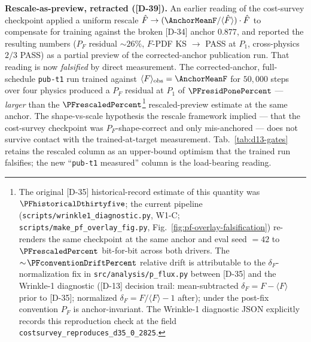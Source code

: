 \textbf{Rescale-as-preview, retracted ([D-39]).} An earlier reading of the cost-survey checkpoint applied a uniform rescale $\hat{F} \to (\AnchorMeanF/\langle\hat{F}\rangle)\cdot\hat{F}$ to compensate for training against the broken [D-34] anchor $0.877$, and reported the resulting numbers ($P_F$ residual $\sim 26\%$, $F$-PDF KS $\to$ PASS at $P_1$, cross-physics $2/3$ PASS) as a partial preview of the corrected-anchor publication run. That reading is now \emph{falsified} by direct measurement. The corrected-anchor, full-schedule \texttt{pub-t1} run trained against $\langle F\rangle_{\text{obs}}=\AnchorMeanF$ for $50{,}000$ steps over four physics produced a $P_F$ residual at $P_1$ of $\PFresidPonePercent$ --- \emph{larger} than the $\PFrescaledPercent$\footnote{The original [D-35] historical-record estimate of this quantity was $\PFhistoricalDthirtyfive$; the current pipeline (\texttt{scripts/wrinkle1\_diagnostic.py}, W1-C; \texttt{scripts/make\_pf\_overlay\_fig.py}, Fig.~\ref{fig:pf-overlay-falsification}) re-renders the same checkpoint at the same anchor and eval seed $=42$ to $\PFrescaledPercent$ bit-for-bit across both drivers. The $\sim\!\PFconventionDriftPercent$ relative drift is attributable to the $\delta_F$-normalization fix in \texttt{src/analysis/p\_flux.py} between [D-35] and the Wrinkle-1 diagnostic ([D-13] decision trail: mean-subtracted $\delta_F = F-\langle F\rangle$ prior to [D-35]; normalized $\delta_F = F/\langle F\rangle - 1$ after); under the post-fix convention $P_F$ is anchor-invariant. The Wrinkle-1 diagnostic JSON explicitly records this reproduction check at the field \texttt{costsurvey\_reproduces\_d35\_0\_2825}.} rescaled-preview estimate at the same anchor. The shape-vs-scale hypothesis the rescale framework implied --- that the cost-survey checkpoint was $P_F$-shape-correct and only mis-anchored --- does not survive contact with the trained-at-target measurement. Tab.~\ref{tab:d13-gates} retains the rescaled column as an upper-bound optimism that the trained run falsifies; the new ``\texttt{pub-t1} measured'' column is the load-bearing reading.

